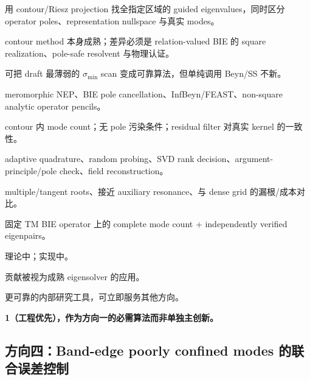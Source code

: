 \documentclass[UTF8,11pt,fontset=none]{ctexart}
\begin{document}
\begin{description}[style=multiline,leftmargin=4.4cm,labelwidth=4.1cm]
  \item[核心问题：] 用 contour/Riesz projection 找全指定区域的 guided eigenvalues，同时区分 operator poles、representation nullspace 与真实 modes。
  \item[差异：] contour method 本身成熟；差异必须是 relation-valued BIE 的 square realization、pole-safe resolvent 与物理认证。
  \item[创新性：] 可把 draft 最薄弱的 \(\sigma_{\min}\) scan 变成可靠算法，但单纯调用 Beyn/SS 不新。
  \item[继续核实：] meromorphic NEP、BIE pole cancellation、InfBeyn/FEAST、non-square analytic operator pencils。
  \item[主要定理：] contour 内 mode count；无 pole 污染条件；residual filter 对真实 kernel 的一致性。
  \item[算法：] adaptive quadrature、random probing、SVD rank decision、argument-principle/pole check、field reconstruction。
  \item[实验：] multiple/tangent roots、接近 auxiliary resonance、与 dense grid 的漏根/成本对比。
  \item[最小单元：] 固定 TM BIE operator 上的 complete mode count + independently verified eigenpairs。
  \item[难度：] 理论中；实现中。
  \item[风险：] 贡献被视为成熟 eigensolver 的应用。
  \item[失败时保留：] 更可靠的内部研究工具，可立即服务其他方向。
  \item[优先级：] \textbf{1（工程优先），作为方向一的必需算法而非单独主创新。}
\end{description}

\subsection{方向四：Band-edge poorly confined modes 的联合误差控制}
\end{document}
